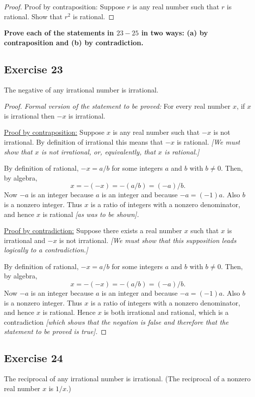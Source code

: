 \documentclass[14pt]{extarticle}
\newcommand{\cy}{\color{cyan}}
\begin{document}
\begin{proof}
    Proof by contraposition: Suppose $r$ is any real number such that $r$ is rational. Show that $r^2$ is rational.
\end{proof}

{\bf \cy Prove each of the statements in $23-25$ in two ways: (a) by contraposition and (b) by contradiction.}

\subsection{Exercise 23}
The negative of any irrational number is irrational.

\begin{proof}
    {\it Formal version of the statement to be proved:} For every real number $x$, if $x$ is irrational then $-x$ is irrational.

    \underline{Proof by contraposition:} Suppose $x$ is any real number such that $-x$ is not irrational. By definition of irrational this means that $-x$ is rational. {\it [We must show that $x$ is not irrational, or, equivalently, that $x$ is rational.]}

    By definition of rational, $-x = a/b$ for some integers $a$ and $b$ with $b \neq 0$. Then, by algebra,
    \[
        x = -(-x) = -(a/b) = (-a)/b.
    \]
    Now $-a$ is an integer because $a$ is an integer and because $-a = (-1)a$. Also $b$ is a nonzero integer. Thus $x$ is a ratio of integers with a nonzero denominator, and hence $x$ is rational {\it [as was to be shown].}

    \underline{Proof by contradiction:} Suppose there exists a real number $x$ such that $x$ is irrational and $-x$ is not irrational. {\it [We must show that this supposition leads logically to a contradiction.]}

    By definition of rational, $-x = a/b$ for some integers $a$ and $b$ with $b \neq 0$. Then, by algebra,
    \[
        x = -(-x) = -(a/b) = (-a)/b.
    \]
    Now $-a$ is an integer because $a$ is an integer and because $-a = (-1)a$. Also $b$ is a nonzero integer. Thus $x$ is a ratio of integers with a nonzero denominator, and hence $x$ is rational. Hence $x$ is both irrational and rational, which is a contradiction {\it [which shows that the negation is false and therefore that the statement to be proved is true].}
\end{proof}

\subsection{Exercise 24}
The reciprocal of any irrational number is irrational. (The reciprocal of a nonzero real number $x$ is $1/x$.)
\end{document}
